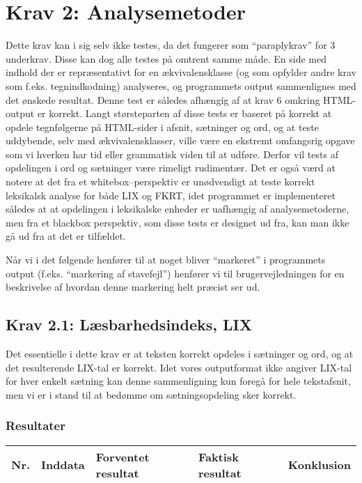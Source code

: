 \documentclass[a4paper,oneside,article]{memoir}
\begin{document}
\begin{landscape}
\begin{longtable}[c]{p{20pt}|p{220pt}|p{130pt}|p{130pt}|p{50pt}}
\end{longtable}

\section{Krav 2: Analysemetoder}

Dette krav kan i sig selv ikke testes, da det fungerer som
``paraplykrav'' for 3 underkrav. Disse kan dog alle testes på omtrent
samme måde. En side med indhold der er repræsentativt for en
ækvivalensklasse (og som opfylder andre krav som
f.eks. tegnindkodning) analyseres, og programmets output sammenlignes
med det ønskede resultat. Denne test er således afhængig af at krav 6
omkring HTML-output er korrekt. Langt størsteparten af disse tests er
baseret på korrekt at opdele tegnfølgerne på HTML-sider i afsnit,
sætninger og ord, og at teste uddybende, selv med ækvivalensklasser,
ville være en ekstremt omfangsrig opgave som vi hverken har tid eller
grammatisk viden til at udføre. Derfor vil tests af opdelingen i ord
og sætninger være rimeligt rudimentær. Det er også værd at notere at
det fra et whitebox--perspektiv er unødvendigt at teste korrekt
leksikalsk analyse for både LIX og FKRT, idet programmet er
implementeret således at at opdelingen i leksikalske enheder er
uafhængig af analysemetoderne, men fra et blackbox perspektiv, som
disse tests er designet ud fra, kan man ikke gå ud fra at det er
tilfældet.

Når vi i det følgende henfører til at noget bliver ``markeret'' i
programmets output (f.eks. ``markering af stavefejl'') henfører vi til
brugervejledningen for en beskrivelse af hvordan denne markering helt
præcist ser ud.

\subsection{Krav 2.1: Læsbarhedsindeks, LIX}

Det essentielle i dette krav er at teksten korrekt opdeles i sætninger
og ord, og at det resulterende LIX-tal er korrekt. Idet vores
outputformat ikke angiver LIX-tal for hver enkelt sætning kan denne
sammenligning kun foregå for hele tekstafsnit, men vi er i stand til
at bedømme om sætningsopdeling sker korrekt.

\subsubsection{Resultater}
\begin{longtable}[c]{p{20pt}|p{220pt}|p{130pt}|p{130pt}|p{50pt}}
\textbf{Nr.} &
\textbf{Inddata} &
\textbf{Forventet resultat} &
\textbf{Faktisk resultat} &
\textbf{Konklusion} \\ \hline


\end{longtable}
\end{landscape}
\end{document}
